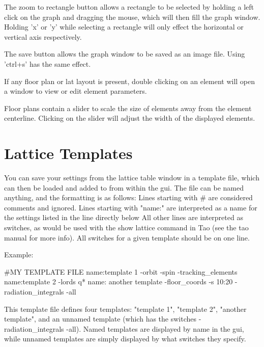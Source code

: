 The zoom to rectangle button allows a rectangle to be selected by holding a left click on the graph and dragging the mouse, which will then fill the graph window. Holding 'x' or 'y' while selecting a rectangle will only effect the horizontal or vertical axis respectively.

The save button allows the graph window to be saved as an image file. Using 'ctrl+s' has the same effect.

If any floor plan or lat layout is present, double clicking on an element will open a window to view or edit element parameters.

Floor plans contain a slider to scale the size of elements away from the element centerline. Clicking on the slider will adjust the width of the displayed elements.

\section{Lattice Templates}
\label{s:gui.lat}

You can save your settings from the lattice table window in a template file, which can then be loaded and added to from within the gui.
The file can be named anything, and the formatting is as follows:
Lines starting with \# are considered comments and ignored.
Lines starting with "name:" are interpreted as a name for the settings listed in the line directly below
All other lines are interpreted as switches, as would be used with the show lattice command in Tao (see the tao manual for more info).
All switches for a given template should be on one line.

Example:
\begin{example}
#MY TEMPLATE FILE
name:template 1
-orbit -spin -tracking_elements
name:template 2
-lords q*
name: another template
-floor_coords -s 10:20
-radiation_integrals -all
\end{example}

This template file defines four templates: "template 1", "template 2", "another template", and an unnamed template (which has the switches -radiation_integrals -all).  Named templates are displayed by name in the gui, while unnamed templates are simply displayed by what switches they specify.

